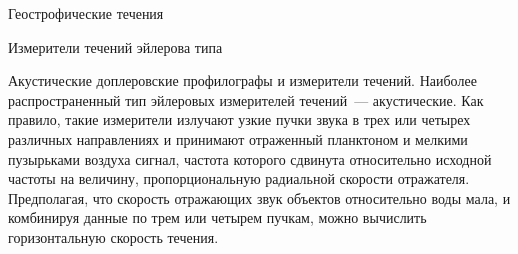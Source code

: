 \begin{chapter}{Геострофические течения}
\begin{section}{Измерители течений эйлерова типа}
\begin{paragraph}{Акустические доплеровские профилографы и измерители течений.}
%
Наиболее распространенный тип эйлеровых измерителей течений~--- акустические.
Как правило, такие измерители излучают узкие пучки звука в трех или четырех 
различных направлениях и принимают отраженный планктоном и мелкими пузырьками 
воздуха сигнал, частота которого сдвинута относительно исходной частоты 
на величину, пропорциональную радиальной скорости отражателя. 
Предполагая, что скорость отражающих звук объектов относительно воды мала,
и комбинируя данные по трем или четырем пучкам, можно вычислить горизонтальную 
скорость течения.
%


\end{paragraph}
\end{section}
\end{chapter}
